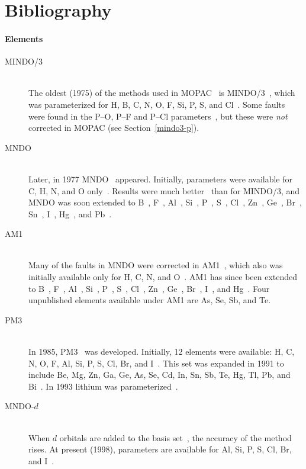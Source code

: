 \chapter {Bibliography }

\subsubsection*{Elements}
\begin{description}
\item[MINDO/3]~\\
The oldest (1975) of the methods used in MOPAC~\cite{mopac} is
MINDO/3~\cite{mindo3}, which was parameterized for H, B, C, N, O, F, Si, P, S,
and Cl~\cite{mindo3}. Some faults were found in the P--O, P--F and P--Cl
parameters~\cite{mindo3-p}, but these were \emph{not} corrected in MOPAC (see
Section~\ref{mindo3-p}).

\item[MNDO]~\\
Later, in 1977 MNDO~\cite{mndo1} appeared.   Initially, parameters were
available for C, H, N, and O only~\cite{mndo1}.  Results were much
better~\cite{mndo2} than  for MINDO/3, and MNDO was soon extended to
B~\cite{mndo-al}, F~\cite{mndo-f},
Al~\cite{mndo-al}, Si~\cite{mndo-si},  P~\cite{mndo-p}, S~\cite{mndo-s},
Cl~\cite{mndo-cl},
Zn~\cite{mndo-zn},  Ge~\cite{mndo-ge}, Br~\cite{mndo-br}, Sn~\cite{mndo-sn},
I~\cite{mndo-i}, Hg~\cite{mndo-hg}, and Pb~\cite{mndo-pb}.

\item[AM1]~\\
Many of the faults in MNDO were corrected in AM1~\cite{am1}, which also was
initially available only for H, C, N, and O~\cite{am1}.  AM1 has since been
extended to B~\cite{am1-b}, F~\cite{am1-x}, Al~\cite{am1-al},
Si~\cite{am1-si},  P~\cite{am1-p}, S~\cite{am1-s}, Cl~\cite{am1-x},
Zn~\cite{am1-zn}, Ge~\cite{am1-ge},  Br~\cite{am1-x},  I~\cite{am1-x}, and
Hg~\cite{am1-hg}. Four unpublished elements available under AM1 are As, Se, Sb,
and Te.

\item[PM3]~\\
In 1985, PM3~\cite{pm3-1} was developed.  Initially, 12 elements were
available: H, C, N, O, F, Al, Si, P, S, Cl, Br, and I~\cite{pm3-2}. This set
was expanded in 1991 to include Be, Mg, Zn, Ga, Ge, As, Se, Cd, In, Sn, Sb, Te,
Hg, Tl, Pb, and Bi~\cite{pm3-3}.  In 1993 lithium was
parameterized~\cite{pm3-li}.

\item[MNDO-$d$]~\\
When $d$ orbitals are added to the basis set~\cite{mndod}, the accuracy of the
method rises.  At present (1998), parameters are available for Al, Si, P, S,
Cl, Br, and I~\cite{mndod}.
\end{description}

